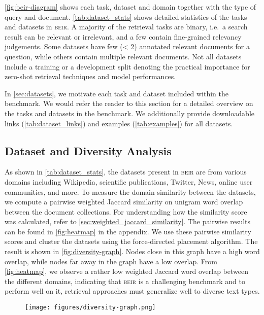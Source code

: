 \documentclass[11pt]{article}
\newcommand{\custo}[1]{\textsc{\normalsize #1}}
\newcommand{\beir}{\custo{beir}\xspace}
\begin{document}
\autoref{fig:beir-diagram} shows each task, dataset and domain together with the type of query and document. \autoref{tab:dataset_stats} shows detailed statistics of the tasks and datasets in \beir. A majority of the retrieval tasks are binary, i.e.\ a search result can be relevant or irrelevant, and a few contain fine-grained relevancy judgements.
Some datasets have few (< 2) annotated relevant documents for a question, while others contain multiple relevant documents. Not all datasets include a training or a development split denoting the practical importance for zero-shot retrieval techniques and model performances.


In \autoref{sec:datasets}, we motivate each task and dataset included within the benchmark. We would refer the reader to this section for a detailed overview on the tasks and datasets in the benchmark. We additionally provide downloadable links (\autoref{tab:dataset_links}) and examples (\autoref{tab:examples}) for all datasets.

\subsection{Dataset and Diversity Analysis}
As shown in \autoref{tab:dataset_stats}, the datasets present in \beir are from various domains including Wikipedia, scientific publications, Twitter, News, online user communities, and more. To measure the domain similarity between the datasets, we compute a pairwise weighted Jaccard similarity \cite{ioffe2010improved} on unigram word overlap between the document collections. For understanding how the similarity score was calculated, refer to \autoref{sec:weighted_jaccard_similarity}. The pairwise results can be found in \autoref{fig:heatmap} in the appendix. We use these pairwise similarity scores and cluster the datasets using the force-directed placement algorithm. The result is shown in \autoref{fig:diversity-graph}. Nodes close in this graph have a high word overlap, while nodes far away in the graph have a low overlap. From \autoref{fig:heatmap}, we observe a rather low weighted Jaccard word overlap between the different domains, indicating that \beir is a challenging benchmark and to perform well on it, retrieval approaches must generalize well to diverse text types.

\begin{figure}[htb!]
\centering
\begin{center}
    \texttt{[image: figures/diversity-graph.png]}
    \label{fig:diversity-graph}
\end{center}
\vspace*{-\baselineskip}
\end{figure}
\end{document}
